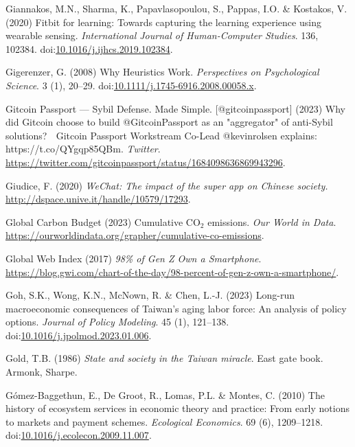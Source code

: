 \documentclass[
  letterpaper,
  DIV=11,
  numbers=noendperiod]{scrartcl}
\newlength{\cslhangindent}
\newenvironment{CSLReferences}[2] %
 {\begin{list}{}{%
  \setlength{\itemindent}{0pt}
  \setlength{\leftmargin}{0pt}
  \setlength{\parsep}{0pt}
  \ifodd #1
   \setlength{\leftmargin}{\cslhangindent}
   \setlength{\itemindent}{-1\cslhangindent}
  \fi
  \setlength{\itemsep}{#2\baselineskip}}}
 {\end{list}}
\begin{document}
\begin{CSLReferences}{0}{1}
Giannakos, M.N., Sharma, K., Papavlasopoulou, S., Pappas, I.O. \&
Kostakos, V. (2020) Fitbit for learning: {Towards} capturing the
learning experience using wearable sensing. \emph{International Journal
of Human-Computer Studies}. 136, 102384.
doi:\href{https://doi.org/10.1016/j.ijhcs.2019.102384}{10.1016/j.ijhcs.2019.102384}.

Gigerenzer, G. (2008) Why {Heuristics Work}. \emph{Perspectives on
Psychological Science}. 3 (1), 20--29.
doi:\href{https://doi.org/10.1111/j.1745-6916.2008.00058.x}{10.1111/j.1745-6916.2008.00058.x}.

Gitcoin Passport --- Sybil Defense. Made Simple. {[}@gitcoinpassport{]}
(2023) Why did {Gitcoin} choose to build @{GitcoinPassport} as an
"aggregator" of anti-{Sybil} solutions? 🤔 {Gitcoin Passport Workstream
Co-Lead} @kevinrolsen explains: {https://t.co/QYgqp85QBm}.
\emph{Twitter}.
\url{https://twitter.com/gitcoinpassport/status/1684098636869943296}.

Giudice, F. (2020) \emph{{WeChat}: The impact of the super app on
{Chinese} society.} \url{http://dspace.unive.it/handle/10579/17293}.

Global Carbon Budget (2023) Cumulative {CO}{\(_2\)} emissions. \emph{Our
World in Data}.
\url{https://ourworldindata.org/grapher/cumulative-co-emissions}.

Global Web Index (2017) \emph{98\% of {Gen Z Own} a {Smartphone}}.
\url{https://blog.gwi.com/chart-of-the-day/98-percent-of-gen-z-own-a-smartphone/}.

Goh, S.K., Wong, K.N., McNown, R. \& Chen, L.-J. (2023) Long-run
macroeconomic consequences of {Taiwan}'s aging labor force: An analysis
of policy options. \emph{Journal of Policy Modeling}. 45 (1), 121--138.
doi:\href{https://doi.org/10.1016/j.jpolmod.2023.01.006}{10.1016/j.jpolmod.2023.01.006}.

Gold, T.B. (1986) \emph{State and society in the {Taiwan} miracle}. East
gate book. Armonk, Sharpe.

Gómez-Baggethun, E., De Groot, R., Lomas, P.L. \& Montes, C. (2010) The
history of ecosystem services in economic theory and practice: {From}
early notions to markets and payment schemes. \emph{Ecological
Economics}. 69 (6), 1209--1218.
doi:\href{https://doi.org/10.1016/j.ecolecon.2009.11.007}{10.1016/j.ecolecon.2009.11.007}.


\end{CSLReferences}
\end{document}
